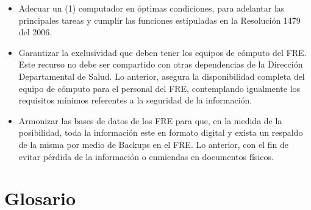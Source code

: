 \documentclass[
  oneside]{book}
\begin{document}
\begin{itemize}
\item
  Adecuar un (1) computador en óptimas condiciones, para adelantar las principales tareas y cumplir las funciones estipuladas en la Resolución 1479 del 2006.
\item
  Garantizar la exclusividad que deben tener los equipos de cómputo del FRE. Este recurso no debe ser compartido con otras dependencias de la Dirección Departamental de Salud. Lo anterior, asegura la disponibilidad completa del equipo de cómputo para el personal del FRE, contemplando igualmente los requisitos mínimos referentes a la seguridad de la información.
\item
  Armonizar las bases de datos de los FRE para que, en la medida de la posibilidad, toda la información este en formato digital y exista un respaldo de la misma por medio de Backups en el FRE. Lo anterior, con el fin de evitar pérdida de la información o enmiendas en documentos físicos.
\end{itemize}

\hypertarget{glosario}{%
\chapter*{Glosario}\label{glosario}}
\end{document}
